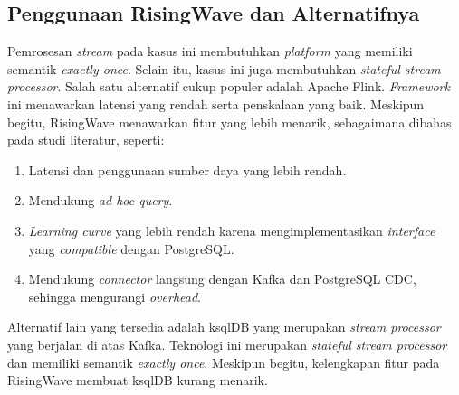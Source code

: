 \subsection{Penggunaan RisingWave dan Alternatifnya}

Pemrosesan \textit{stream} pada kasus ini membutuhkan \textit{platform} yang memiliki semantik \textit{exactly once}. Selain itu, kasus ini juga membutuhkan \textit{stateful stream processor}. Salah satu alternatif cukup populer adalah Apache Flink. \textit{Framework} ini menawarkan latensi yang rendah serta penskalaan yang baik. Meskipun begitu, RisingWave menawarkan fitur yang lebih menarik, sebagaimana dibahas pada studi literatur, seperti:

\begin{enumerate}
    \item Latensi dan penggunaan sumber daya yang lebih rendah.
    \item Mendukung \textit{ad-hoc query}.
    \item \textit{Learning curve} yang lebih rendah karena mengimplementasikan \textit{interface} yang \textit{compatible} dengan PostgreSQL.
    \item Mendukung \textit{connector} langsung dengan Kafka dan PostgreSQL CDC, sehingga mengurangi \textit{overhead}.
\end{enumerate}

Alternatif lain yang tersedia adalah ksqlDB yang merupakan \textit{stream processor} yang berjalan di atas Kafka. Teknologi ini merupakan \textit{stateful stream processor} dan memiliki semantik \textit{exactly once}. Meskipun begitu, kelengkapan fitur pada RisingWave membuat ksqlDB kurang menarik.